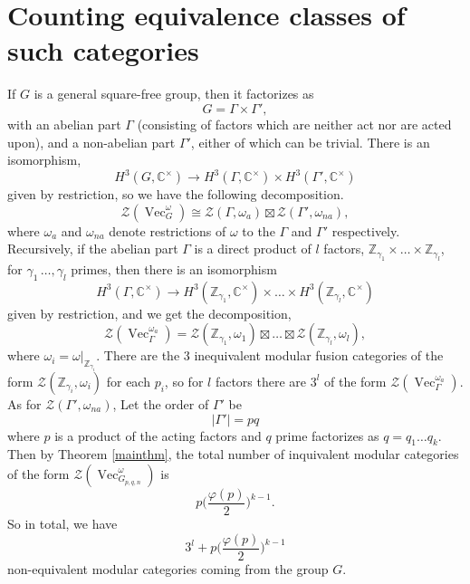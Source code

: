\documentclass[11pt]{book}
\theoremstyle{Rem}
\theoremstyle{definition}
\numberwithin{equation}{section}
\newcommand\Vect{\operatorname{Vec}}
\newcommand\CC{\mathbb C}
\newcommand\ZZ{\mathbb Z}
\newcommand\CTR{\mathcal Z}
\begin{document}
\section{Counting equivalence classes of such categories}
If $G$ is a general square-free group, then it factorizes as \begin{equation}
	G= \Gamma \times \Gamma',
\end{equation} with an abelian part $\Gamma$ (consisting of factors which are neither act nor are acted upon), and a non-abelian part $\Gamma'$, either of which can be trivial. There is an isomorphism,
\begin{equation}
	H^3(G, \CC^\times) \rightarrow H^3(\Gamma, \CC^\times) \times H^3(\Gamma', \CC^\times)
\end{equation} given by restriction, so we have the following decomposition.
\begin{equation}
	\CTR(\Vect^\omega_G) \cong \CTR(\Gamma, \omega_a) \boxtimes  \CTR(\Gamma', \omega_{na}),
\end{equation} where $\omega_a$ and $\omega_{na}$ denote restrictions of $\omega$ to the $\Gamma$ and $\Gamma'$ respectively.  Recursively, if the abelian part $\Gamma$ is a direct product of $l$ factors, $\ZZ_{\gamma_1}\times\dots\times \ZZ_{\gamma_l}$, for $\gamma_1\, \dots, \gamma_l$ primes, then there is an isomorphism \begin{equation}
	H^3(\Gamma, \CC^\times) \rightarrow H^3(\ZZ_{\gamma_1}, \CC^\times) \times \dots \times H^3(\ZZ_{\gamma_l}, \CC^\times)
\end{equation} given by restriction, and we get the decomposition, \begin{equation}
	\CTR(\Vect^{\omega_a}_\Gamma) = \CTR(\ZZ_{\gamma_1}, \omega_1) \boxtimes \dots \boxtimes \CTR(\ZZ_{\gamma_l}, \omega_l),
\end{equation}
where $\omega_i = \omega|_{\ZZ_{\gamma_i}}$.
There are the 3 inequivalent modular fusion categories of the form $\CTR(\ZZ_{\gamma_i}, \omega_i)$ for each $p_i$, so for $l$ factors there are $3^l$ of the form 
$\CTR(\Vect^{\omega_a}_\Gamma)$.
As for $\CTR(\Gamma', \omega_{na})$, Let the order of $\Gamma'$ be  \begin{equation}
	|\Gamma'| = pq
\end{equation} where $p$ is a product of the acting factors and $q$ prime factorizes as $q= q_1 \dots q_k$. Then by Theorem \ref{mainthm}, the total number of inquivalent modular categories of the form $\CTR(\Vect^\omega_{G_{p,q,n}})$ is \begin{equation}
	p\bigg(\frac{\varphi(p)}2\bigg)^{k-1}.
\end{equation}
So in total, we have \begin{equation}
	3^l + p\bigg(\frac{\varphi(p)}2\bigg)^{k-1}
\end{equation} non-equivalent modular categories coming from the group $G$.
\end{document}
